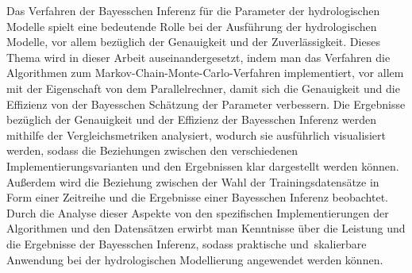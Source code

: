 Das Verfahren der Bayesschen Inferenz für die Parameter der hydrologischen Modelle spielt eine bedeutende Rolle bei der Ausführung der hydrologischen Modelle, vor allem bezüglich der Genauigkeit und der Zuverlässigkeit. Dieses Thema wird in dieser Arbeit auseinandergesetzt, indem man das Verfahren die Algorithmen zum Markov-Chain-Monte-Carlo-Verfahren implementiert, vor allem mit der Eigenschaft von dem Parallelrechner, damit sich die Genauigkeit und die Effizienz von der Bayesschen Schätzung der Parameter verbessern. Die Ergebnisse bezüglich der Genauigkeit und der Effizienz der Bayesschen Inferenz werden mithilfe der Vergleichsmetriken analysiert, wodurch sie ausführlich visualisiert werden, sodass die Beziehungen zwischen den verschiedenen Implementierungsvarianten und den Ergebnissen klar dargestellt werden können. Außerdem wird die Beziehung zwischen der Wahl der Trainingsdatensätze in Form einer Zeitreihe und die Ergebnisse einer Bayesschen Inferenz beobachtet. Durch die Analyse dieser Aspekte von den spezifischen Implementierungen der Algorithmen und den Datensätzen erwirbt man Kenntnisse über die Leistung und die Ergebnisse der Bayesschen Inferenz, sodass praktische und skalierbare Anwendung bei der hydrologischen Modellierung angewendet werden können.